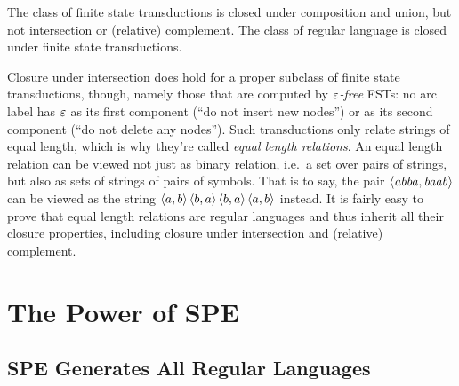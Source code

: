 \begin{theorem}
    The class of finite state transductions is closed under composition and union, but not intersection or (relative) complement.
    The class of regular language is closed under finite state transductions.
\end{theorem}
%
Closure under intersection does hold for a proper subclass of finite state transductions, though, namely those that are computed by \emph{$\varepsilon$-free} FSTs: no arc label has $\varepsilon$ as its first component (``do not insert new nodes'') or as its second component (``do not delete any nodes'').
Such transductions only relate strings of equal length, which is why they're called \emph{equal length relations}.
An equal length relation can be viewed not just as binary relation, i.e.\ a set over pairs of strings, but also as sets of strings of pairs of symbols.
That is to say, the pair $\left \langle \mathit{abba},\mathit{baab} \right \rangle $ can be viewed as the string $\left \langle a,b \right \rangle \left \langle b,a \right \rangle \left \langle b,a \right \rangle \left \langle a,b \right \rangle $ instead.
It is fairly easy to prove that equal length relations are regular languages and thus inherit all their closure properties, including closure under intersection and (relative) complement.


\section{The Power of SPE}

\subsection{SPE Generates All Regular Languages}


